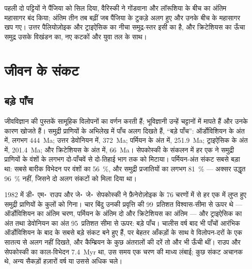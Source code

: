 पहली दो पट्टियों ने पैंजिया को सिल दिया, वैरिस्की ने गोंडवाना और लॉरूशिया के बीच का अंतिम
महासागर बंद किया; अंतिम तीन तब बढ़ीं जब पैंजिया के टुकड़े अलग हुए और उनके बीच के
महासागर खप गए। उत्तर पैलियोज़ोइक और ट्राइऐसिक का नीचा समुद्र-स्तर इसी
 का है, और क्रिटेशियस का ऊँचा समुद्र उसके विखंडन का, नए कटकों और युवा
तल के साथ।

\section{जीवन के संकट}\label{sec:b2:phanerozoic-earth:extinctions}

\subsection*{बड़े पाँच}

जीवविज्ञान की पुस्तकें सामूहिक विलोपनों का वर्णन करती हैं; भूविज्ञानी उन्हें चट्टानों में मापते हैं और
उनके कारण खोजते हैं। समुद्री प्राणियों के अभिलेख में पाँच अलग दिखते हैं, ``बड़े पाँच'':
ऑर्डोविशियन के अंत में, लगभग \qty{444}{Ma}; उत्तर डेवोनियन में, \qty{372}{Ma}; पर्मियन के अंत में,
\qty{251.9}{Ma}; ट्राइऐसिक के अंत में, \qty{201.4}{Ma}; और क्रिटेशियस के अंत में,
\qty{66}{Ma}। सेपकोस्की के संकलन में हर एक ने समुद्री प्राणियों के वंशों के लगभग दो-पाँचवें
से दो-तिहाई भाग तक को मिटाया। पर्मियन-अंत संकट सबसे बड़ा था: सबसे बारीक विभेदन पर वंशों का
\qty{56}{\percent}, और समुद्री प्रजातियों का लगभग \qty{81}{\percent} --- अक्सर उद्धृत
\qty{96}{\percent} नहीं, जिसने दो अलग संकटों को मिला दिया था।

\begin{history}[बड़े पाँच, चालीस वर्ष बाद]
1982 में डी॰~एम॰~राउप और जे॰~जे॰~सेपकोस्की ने फ़ैनेरोज़ोइक के 76 चरणों में से हर एक में लुप्त
हुए समुद्री प्राणियों के कुलों को गिना। चार बिंदु उनकी प्रवृत्ति की 99~प्रतिशत विश्वास-सीमा से
ऊपर थे --- ऑर्डोविशियन का अंतिम चरण, पर्मियन के अंतिम दो और क्रिटेशियस का
अंतिम --- और ट्राइऐसिक का अंत तथा डेवोनियन का अंत 95~प्रतिशत
सीमा से ऊपर: बड़े पाँच। चालीस वर्ष बाद भी पाँचों आरंभिक ऑर्डोविशियन के बाद के सबसे बड़े संकट
बने हुए हैं, पर बेहतर आँकड़ों के साथ वे विलोपन-दरों के एक सातत्य से अलग नहीं दिखते,
और कैम्ब्रियन के कुछ अंतरालों की दरें तो और भी ऊँची थीं। राउप और सेपकोस्की का
काल-विभेदन \qty{7.4}{Myr} था, उस समय एक चरण की माध्य लंबाई; कुछ संकट अचानक थे, अन्य
सैकड़ों हज़ारों वर्ष या उससे अधिक चले।
\end{history}

